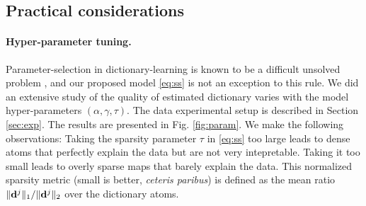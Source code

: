 \subsection{Practical considerations}
\paragraph{Hyper-parameter tuning.}
Parameter-selection in dictionary-learning is known to be a difficult unsolved
problem   \citep{mairal2010,jenatton2010structured}, and our proposed model \eqref{eq:ss} is not an exception to this rule. We did an extensive study of the quality of estimated dictionary varies with the model hyper-parameters $(\alpha,\gamma,\tau)$. The data experimental setup is described in Section \ref{sec:exp}.
The results are presented in Fig. \ref{fig:param}.
We make the following observations:
Taking the sparsity parameter $\tau$ in \eqref{eq:ss} too large leads to dense atoms that perfectly explain the data but are not very intepretable. Taking it too small leads to overly sparse maps that barely explain the data. This normalized sparsity metric (small is better, \textit{ceteris paribus}) is defined as the mean ratio $\|\mathbf{d}^j\|_1 / \|\mathbf{d}^j\|_2$ over the dictionary atoms. %
